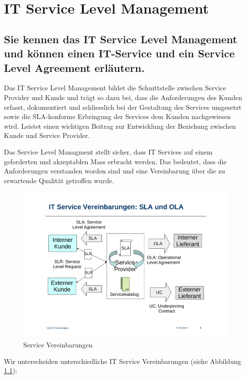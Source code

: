 \chapter{IT Service Level Management}
\label{sec:service-level-management}

\section{Sie kennen das IT Service Level Management und können einen IT-Service und ein Service Level Agreement erläutern.}
Das IT Service Level Management bildet die Schnittstelle zwischen Service Provider und Kunde und trägt so dazu bei, dass die Anforderungen des Kunden erfasst, dokumentiert und schliesslich bei der Gestaltung des Services umgesetzt sowie die SLA-konforme Erbringung der Services dem Kunden nachgewiesen wird. Leistet einen wichtigen Beitrag zur Entwicklung der Beziehung zwischen Kunde und Service Provider.

Das Service Level Managment stellt sicher, dass IT Services auf einem geforderten und akzeptablen Mass erbracht werden. Das bedeutet, dass die Anforderungen verstanden worden sind und eine Vereinbarung über die zu erwartende Qualität getroffen wurde.

\begin{figure}[h!]
	\centering
	\includegraphics[width=0.7\linewidth]{fig/it-service-mgmt-service-vereinbarungen}
	\caption{Service Vereinbarungen}
	\label{fig:it-service-mgmt-service-vereinbarungen}
\end{figure}

Wir unterscheiden unterschiedliche IT Service Vereinbarungen (siehe Abbildung \ref{fig:it-service-mgmt-service-vereinbarungen}):

